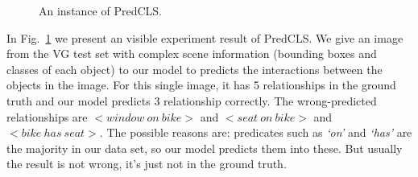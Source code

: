 \begin{figure}[h!]
{\begin{minipage}[t]{4.5cm}
	\end{minipage}}
	
	\caption[An instance of PredCLS]{An instance of PredCLS.}
	\label{fig:predcls}
\end{figure}
In Fig.~\ref{fig:predcls} we present an visible experiment result of PredCLS. We give an image from the VG test set with complex scene information (bounding boxes and classes of each object) to our  model to predicts the interactions between the objects in the image. For this single image, it has 5 relationships in the ground truth and our model predicts 3 relationship correctly. The wrong-predicted relationships are $ <window\ on\ bike >$ and $<seat\ on\ bike>$ and $<bike\ has\ seat>$. The possible reasons are: predicates such as \textit{`on' }and \textit{`has' } are the majority in our data set, so our model predicts them into these. But usually the result is not wrong, it's just not in the ground truth.

